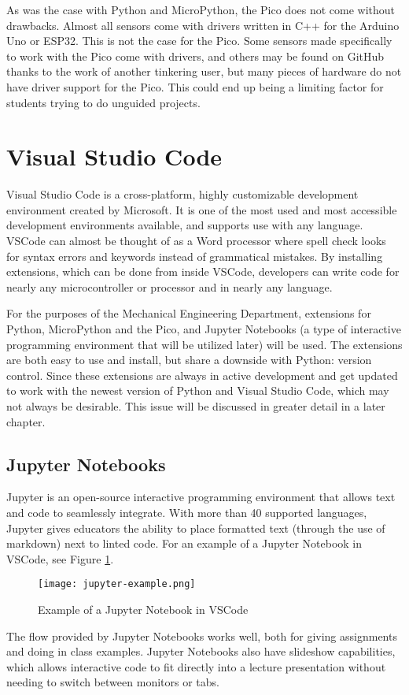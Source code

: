 As was the case with Python and MicroPython, the Pico does not come without drawbacks. Almost all 
sensors come with drivers written in C++ for the Arduino Uno or ESP32. This is not the case for 
the Pico. Some sensors made specifically to work with the Pico come with drivers, and others may 
be found on GitHub thanks to the work of another tinkering user, but many pieces of hardware do 
not have driver support for the Pico. This could end up being a limiting factor for students trying 
to do unguided projects.

\section{Visual Studio Code}

Visual Studio Code is a cross-platform, highly customizable development environment created by
Microsoft. It is one of the most used and most accessible development environments available, 
and supports use with any language. VSCode can almost be thought of as a Word processor where 
spell check looks for syntax errors and keywords instead of grammatical mistakes. By installing
extensions, which can be done from inside VSCode, developers can write code for nearly any 
microcontroller or processor and in nearly any language.

For the purposes of the Mechanical Engineering Department, extensions for Python, MicroPython and
the Pico, and Jupyter Notebooks (a type of interactive programming environment that will be utilized
later) will be used. The extensions are both easy to use and install, but share a downside with
Python: version control. Since these extensions are always in active development and get updated
to work with the newest version of Python and Visual Studio Code, which may not always be desirable.
This issue will be discussed in greater detail in a later chapter.

\subsection{Jupyter Notebooks}

Jupyter is an open-source interactive programming environment that allows text and code to 
seamlessly integrate. With more than 40 supported languages, Jupyter gives educators the ability
to place formatted text (through the use of markdown) next to linted code. For an example
of a Jupyter Notebook in VSCode, see Figure \ref{fig:jupyter_example}.

\begin{figure}[h]
    \texttt{[image: jupyter-example.png]}
    \centering
    \caption{Example of a Jupyter Notebook in VSCode}
    \centering
    \label{fig:jupyter_example}
\end{figure}

The flow provided by Jupyter Notebooks works well, both for giving assignments and
doing in class examples. Jupyter Notebooks also have slideshow capabilities, which allows 
interactive code to fit directly into a lecture presentation without needing to switch between
monitors or tabs.
